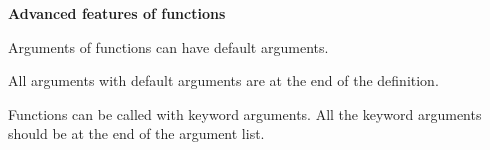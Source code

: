 \textbf{Advanced features of functions}

Arguments of functions can have default arguments. 

All arguments with default arguments are at the end of the definition.

Functions can be called with keyword arguments. All the keyword
arguments should be at the end of the argument list. 

